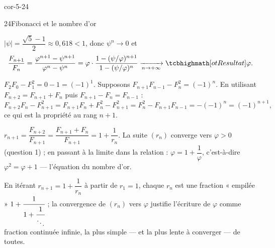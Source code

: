 \begin{blocLivre}{cor-5-24}
\begin{corrige}{24}{Fibonacci et le nombre d'or}
\begin{questions}
  \item $|\psi|=\dfrac{\sqrt5-1}{2}\approx0{,}618<1$, donc
    $\psi^{n}\to0$ et
    \[
      \frac{F_{n+1}}{F_n}=\frac{\varphi^{n+1}-\psi^{n+1}}{\varphi^{n}-\psi^{n}}
      =\varphi\cdot\frac{1-(\psi/\varphi)^{n+1}}{1-(\psi/\varphi)^{n}}
      \xrightarrow[n\to+\infty]{}\res{\varphi}.
    \]
  \item {} $F_2F_0-F_1^{2}=0-1=(-1)^{1}$.
     Supposons $F_{n+1}F_{n-1}-F_n^{2}=(-1)^{n}$. En
    utilisant $F_{n+2}=F_{n+1}+F_n$ puis $F_{n+1}-F_n=F_{n-1}$ :
    \[
      F_{n+2}F_n-F_{n+1}^{2}=F_{n+1}F_n+F_n^{2}-F_{n+1}^{2}
      =F_n^{2}-F_{n+1}F_{n-1}=-(-1)^{n}=(-1)^{n+1},
    \]
    ce qui est la propriété au rang $n+1$.
  \item $r_{n+1}=\dfrac{F_{n+2}}{F_{n+1}}=\dfrac{F_{n+1}+F_n}{F_{n+1}}
    =1+\dfrac{1}{r_n}$. La suite $(r_n)$ converge vers $\varphi>0$
    (question 1) ; en passant à la limite dans la relation :
    $\varphi=1+\dfrac{1}{\varphi}$, c'est-à-dire
    $\varphi^{2}=\varphi+1$ — l'équation du nombre d'or.
  \item En itérant $r_{n+1}=1+\dfrac{1}{r_n}$ à partir de $r_1=1$, chaque
    $r_n$ est une fraction « empilée » $1+\cfrac{1}{1+\cfrac{1}{\ddots}}$ ;
    la convergence de $(r_n)$ vers $\varphi$ justifie l'écriture de
    $\varphi$ comme fraction continuée infinie, la plus simple — et la plus
    lente à converger — de toutes.
\end{questions}
\end{corrige}
\end{blocLivre}


